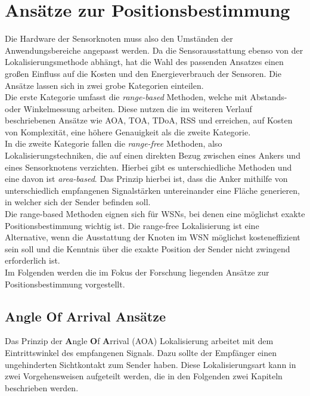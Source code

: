 \documentclass[12pt, a4wide]{scrreprt}
\begin{document}

\chapter{Ansätze zur Positionsbestimmung}
Die Hardware der Sensorknoten muss also den Umständen der Anwendungsbereiche angepasst werden. Da die Sensorausstattung ebenso von der Lokalisierungsmethode abhängt, hat die Wahl des passenden Ansatzes einen großen Einfluss auf die Kosten und den Energieverbrauch der Sensoren. Die Ansätze lassen sich in zwei grobe Kategorien einteilen.\\
\indent
Die erste Kategorie umfasst die \textit{range-based} Methoden, welche mit Abstands- oder Winkelmessung arbeiten. Diese nutzen die im weiteren Verlauf beschriebenen Ansätze wie AOA, TOA, TDoA, RSS und erreichen, auf Kosten von Komplexität, eine höhere Genauigkeit als die zweite Kategorie.\\
\indent
In die zweite Kategorie fallen die \textit{range-free} Methoden, also Lokalisierungstechniken, die auf einen direkten Bezug zwischen eines Ankers und eines Sensorknotens verzichten. Hierbei gibt es unterschiedliche Methoden und eine davon ist \textit{area-based}\cite{area_based}. Das Prinzip hierbei ist, dass die Anker mithilfe von unterschiedlich empfangenen Signalstärken untereinander eine Fläche generieren, in welcher sich der Sender befinden soll.\\
\indent
Die range-based Methoden eignen sich für WSNs, bei denen eine möglichst exakte Positionsbestimmung wichtig ist. Die range-free Lokalisierung ist eine Alternative, wenn die Ausstattung der Knoten im WSN möglichst kosteneffizient sein soll und die Kenntnis über die exakte Position der Sender nicht zwingend erforderlich ist.\\ 
\indent
Im Folgenden werden die im Fokus der Forschung liegenden Ansätze zur Positionsbestimmung vorgestellt.
  \section{Angle Of Arrival Ansätze}
Das Prinzip der {\bf A}ngle {\bf O}f {\bf A}rrival (AOA) Lokalisierung arbeitet mit dem Eintrittswinkel des empfangenen Signals. Dazu sollte der Empfänger einen ungehinderten Sichtkontakt zum Sender haben. Diese Lokalisierungsart kann in zwei Vorgehensweisen aufgeteilt werden, die in den Folgenden zwei Kapiteln beschrieben werden.
\end{document}
